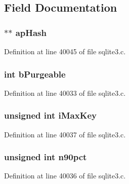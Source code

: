 \subsection{Field Documentation}
\hypertarget{struct_p_cache1_a94d4f471940d8bc81ad553a57c70e5b7}{}
\subsubsection[{ap\+Hash}]{$\ast$$\ast$ ap\+Hash}\label{struct_p_cache1_a94d4f471940d8bc81ad553a57c70e5b7}


Definition at line 40045 of file sqlite3.\+c.

\hypertarget{struct_p_cache1_a75cf18f61ac5e03a6d9822e78cfbdac3}{}
\subsubsection[{b\+Purgeable}]{\setlength{\rightskip}{0pt plus 5cm}int b\+Purgeable}\label{struct_p_cache1_a75cf18f61ac5e03a6d9822e78cfbdac3}


Definition at line 40033 of file sqlite3.\+c.

\hypertarget{struct_p_cache1_a690bbea3436a73a6f1fa2655c4ff4c59}{}
\subsubsection[{i\+Max\+Key}]{\setlength{\rightskip}{0pt plus 5cm}unsigned int i\+Max\+Key}\label{struct_p_cache1_a690bbea3436a73a6f1fa2655c4ff4c59}


Definition at line 40037 of file sqlite3.\+c.

\hypertarget{struct_p_cache1_a500c26d9d8c6891b7baf7a274a410f2a}{}
\subsubsection[{n90pct}]{\setlength{\rightskip}{0pt plus 5cm}unsigned int n90pct}\label{struct_p_cache1_a500c26d9d8c6891b7baf7a274a410f2a}


Definition at line 40036 of file sqlite3.\+c.

